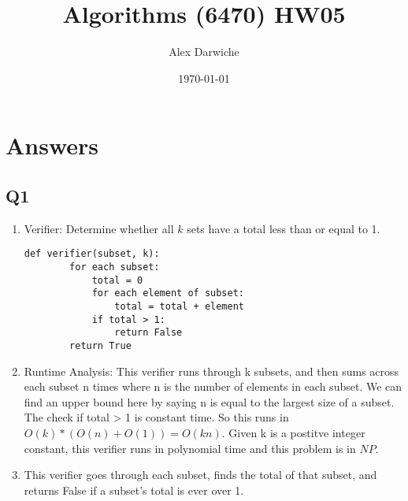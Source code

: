 \documentclass{article}
\title{Algorithms (6470) HW05}
\author{Alex Darwiche}
\date{\today}
\begin{document}
\maketitle

\section*{Answers}

\subsection*{Q1}
\begin{enumerate}[label=(\alph*)]
    \item Verifier: Determine whether all $k$ sets have a total less than or equal to 1.
    \begin{lstlisting}[frame=single]
    def verifier(subset, k):
        for each subset:
            total = 0
            for each element of subset:
                total = total + element
            if total > 1:
                return False
        return True
    \end{lstlisting}
    \item Runtime Analysis: This verifier runs through k subsets, and then sums across each subset n times where n is the number of elements in each subset. We can find an upper bound here by saying n is equal to the largest size of a subset. The check if total > 1 is constant time. So this runs in $O(k)*(O(n)+O(1)) = O(kn)$. Given k is a postitve integer constant, this verifier runs in polynomial time and this problem is in $NP$.
    \item This verifier goes through each subset, finds the total of that subset, and returns False if a subset's total is ever over 1.
\end{enumerate}
\newpage
\end{document}
